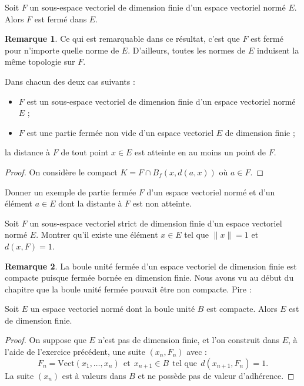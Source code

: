 \documentclass[french]{article}
\newcommand{\Vect}{\text{Vect}}
\theoremstyle{plain}
\theoremstyle{definition}
\newtheorem*{rmq}{Remarque}
\theoremstyle{remark}
\begin{document}
\begin{prop}%
	Soit $F$ un sous-espace vectoriel de dimension finie d'un espace vectoriel normé $E$. Alors $F$ est fermé dans $E$.
\end{prop}

\begin{rmq}
	Ce qui est remarquable dans ce résultat, c'est que $F$ est fermé pour n'importe quelle norme de $E$. D'ailleurs, toutes les normes de $E$ induisent la même topologie sur $F$.
\end{rmq}

\begin{prop}[HP]%
	Dans chacun des deux cas suivants :
	\begin{itemize}
		\item $F$ est un sous-espace vectoriel de dimension finie d'un espace vectoriel normé $E$ ;
		\item $F$ est une partie fermée non vide d'un espace vectoriel $E$ de dimension finie ;
	\end{itemize}
	la distance à $F$ de tout point $x\in E$ est atteinte en au moins un point de $F$.
\end{prop}
\begin{proof}
	On considère le compact $K=F\cap B_f(x,d(a,x))$ où $a\in F$.
\end{proof}

\begin{exo}
	Donner un exemple de partie fermée $F$ d'un espace vectoriel normé et d'un élément $a\in E$ dont la distante à $F$ est non atteinte.
\end{exo}

\begin{exo}
	Soit $F$ un sous-espace vectoriel strict de dimension finie d'un espace vectoriel normé $E$. Montrer qu'il existe une élément $x\in E$ tel que $\lVert x\rVert=1$ et $d(x,F)=1$.
\end{exo}

\begin{rmq}
	La boule unité fermée d'un espace vectoriel de dimension finie est compacte puisque fermée bornée en dimension finie. Nous avons vu au début du chapitre que la boule unité fermée pouvait être non compacte. Pire :
\end{rmq}

\begin{thm}%
	Soit $E$ un espace vectoriel normé dont la boule unité $B$ est compacte. Alors $E$ est de dimension finie.
\end{thm}
\begin{proof}
	On suppose que $E$ n'est pas de dimension finie, et l'on construit dans $E$, à l'aide de l'exercice précédent, une suite $(x_n,F_n)$ avec : $$F_n=\Vect(x_1,\ldots,x_n)\ \ \text{et}\ \ x_{n+1}\in B\ \ \text{tel que}\ \ d(x_{n+1},F_n)=1.$$ La suite $(x_n)$ est à valeurs dans $B$ et ne possède pas de valeur d'adhérence.
\end{proof}
\end{document}

